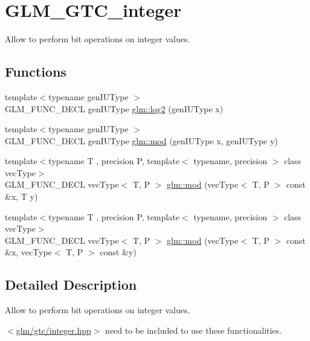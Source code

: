 \hypertarget{group__gtc__integer}{}\section{G\+L\+M\+\_\+\+G\+T\+C\+\_\+integer}
\label{group__gtc__integer}


Allow to perform bit operations on integer values.  


\subsection*{Functions}
\begin{DoxyCompactItemize}
\item 
{\footnotesize template$<$typename gen\+I\+U\+Type $>$ }\\G\+L\+M\+\_\+\+F\+U\+N\+C\+\_\+\+D\+E\+C\+L gen\+I\+U\+Type \hyperlink{group__gtc__integer_ga9bd682e74bfacb005c735305207ec417}{glm\+::log2} (gen\+I\+U\+Type x)
\item 
{\footnotesize template$<$typename gen\+I\+U\+Type $>$ }\\G\+L\+M\+\_\+\+F\+U\+N\+C\+\_\+\+D\+E\+C\+L gen\+I\+U\+Type \hyperlink{group__gtc__integer_ga75c6fd2a143fc44e5f7b871abad539e0}{glm\+::mod} (gen\+I\+U\+Type x, gen\+I\+U\+Type y)
\item 
{\footnotesize template$<$typename T , precision P, template$<$ typename, precision $>$ class vec\+Type$>$ }\\G\+L\+M\+\_\+\+F\+U\+N\+C\+\_\+\+D\+E\+C\+L vec\+Type$<$ T, P $>$ \hyperlink{group__gtc__integer_ga35e7133a920e63775739ebb491e0c2c8}{glm\+::mod} (vec\+Type$<$ T, P $>$ const \&x, T y)
\item 
{\footnotesize template$<$typename T , precision P, template$<$ typename, precision $>$ class vec\+Type$>$ }\\G\+L\+M\+\_\+\+F\+U\+N\+C\+\_\+\+D\+E\+C\+L vec\+Type$<$ T, P $>$ \hyperlink{group__gtc__integer_ga09617ccfdc105bc1c3477105d84f2e00}{glm\+::mod} (vec\+Type$<$ T, P $>$ const \&x, vec\+Type$<$ T, P $>$ const \&y)
\end{DoxyCompactItemize}


\subsection{Detailed Description}
Allow to perform bit operations on integer values. 

$<$\hyperlink{gtc_2integer_8hpp}{glm/gtc/integer.\+hpp}$>$ need to be included to use these functionalities. 

